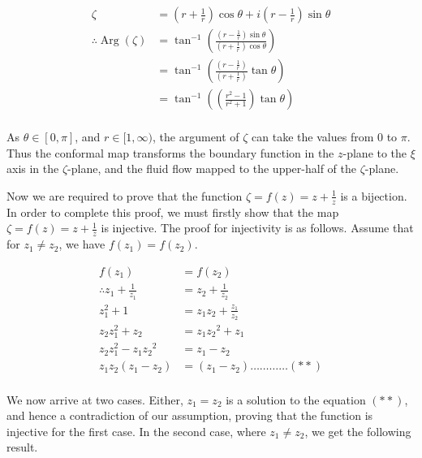 \documentclass[a4paper]{article}
\DeclareMathOperator\Arg{Arg}
\begin{document}
\begin{enumerate}[label=\textbf{\arabic*.}]
\begin{enumerate}
\begin{enumerate}
			\begin{align*}
			\zeta & = \left(r+\frac{1}{r}\right)\cos\theta + i\left(r-\frac{1}{r}\right)\sin\theta\\
			\therefore \Arg(\zeta) & = \tan^{-1}\left(\frac{\left(r-\frac{1}{r}\right)\sin\theta}{\left(r+\frac{1}{r}\right)\cos\theta} \right)\\
			& = \tan^{-1}\left(\frac{\left(r-\frac{1}{r}\right)}{\left(r+\frac{1}{r}\right)}\tan\theta \right)\\
			& = \tan^{-1}\left(\left(\frac{r^2-1}{r^2+1}\right)\tan\theta \right)\\
			\end{align*}

			As $\displaystyle{\theta \in [0,\pi]}$, and $\displaystyle{r \in [1,\infty)}$, the argument of $\displaystyle{\zeta}$ can take the values from $\displaystyle{0}$ to $\displaystyle{\pi}$. Thus the conformal map transforms the boundary function in the $\displaystyle{z}$-plane to the $\displaystyle{\xi}$ axis in the $\displaystyle{\zeta}$-plane, and the fluid flow mapped to the upper-half of the $\displaystyle{\zeta}$-plane. 

			\bigbreak

			Now we are required to prove that the function $\displaystyle{\zeta = f(z) = z + \frac{1}{z}}$ is a bijection. In order to complete this proof, we must firstly show that the map $\displaystyle{\zeta = f(z) = z + \frac{1}{z}}$ is injective. The proof for injectivity is as follows. Assume that for $\displaystyle{z_1 \neq z_2}$, we have $\displaystyle{f(z_1) = f(z_2)}$.

			\begin{align*}
			f(z_1) & = f(z_2)\\
			\therefore z_1 + \frac{1}{z_1} & = z_2 + \frac{1}{z_2}\\
			z_1^2 + 1 & = {z_1}{z_2} + \frac{z_1}{z_2}\\
			z_2{z_1^2} + z_2 & = {z_1}{z_2}^2 + {z_1}\\
			z_2{z_1^2} - {z_1}{z_2}^2 & = {z_1} - z_2\\
			z_1z_2(z_1 - z_2) & = (z_1 - z_2) \dots\dots\dots\dots(**)\\
			\end{align*}

			We now arrive at two cases. Either, $\displaystyle{z_1 = z_2}$ is a solution to the equation $\displaystyle{(**)}$, and hence a contradiction of our assumption, proving that the function is injective for the first case. In the second case, where $\displaystyle{z_1 \neq z_2}$, we get the following result.


\end{enumerate}
\end{enumerate}
\end{enumerate}
\end{document}
